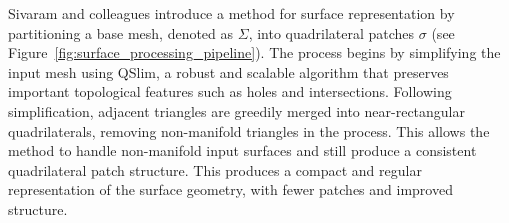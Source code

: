 Sivaram and colleagues introduce a method for surface representation by partitioning a base mesh, denoted as $\Sigma$, into quadrilateral patches $\sigma$ (see Figure~\ref{fig:surface_processing_pipeline}).  
The process begins by simplifying the input mesh using QSlim, a robust and scalable algorithm that preserves important topological features such as holes and intersections.  
Following simplification, adjacent triangles are greedily merged into near-rectangular quadrilaterals, removing non-manifold triangles in the process.  
This allows the method to handle non-manifold input surfaces and still produce a consistent quadrilateral patch structure.  
This produces a compact and regular representation of the surface geometry, with fewer patches and improved structure.  
\usetikzlibrary{calc, shapes.geometric, arrows.meta, decorations.pathreplacing, positioning, shapes}
